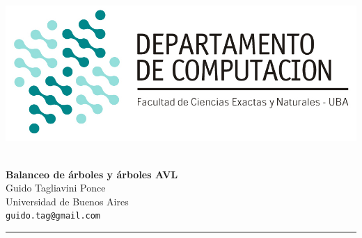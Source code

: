 \hfill \includegraphics[scale = 0.75]{imagenes/logo_dc.jpg}~\\[0.25cm]

\begin{center}
	\textbf{\Large Balanceo de \'arboles y \'arboles AVL}\\[1cm]
	{\large Guido Tagliavini Ponce\\[0.15cm]}
	Universidad de Buenos Aires\\[0.15cm]
	\texttt{guido.tag@gmail.com}\\[1cm]
\end{center}
\rule{\linewidth}{0.2mm}
